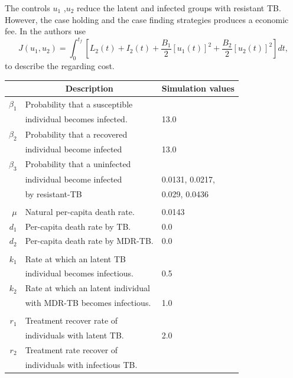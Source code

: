 	The controls $u_1$ ,$u_2$ reduce the latent and infected 
groups with resistant TB. However, the case holding and the case finding 
strategies produces a economic fee. In \cite{Lenhart2002} the authors use
\begin{equation}
	 J(u_1, u_2) =
		 \int_0 ^ {t_f}
			 \left[
				 L_2(t) + I_2(t) 
				 + \frac{B_1}{2} [u_1(t)] ^ 2
				 + \frac{B_2}{2} [u_2(t)] ^ 2
			 \right]dt,
\end{equation}
to describe the regarding cost.
\begin{table}
	\centering
	\begin{tabular}{rll}
		\toprule
			& \multicolumn{1}{c}{\textbf{Description}} & \textbf{Simulation values}
            \\
        \midrule
        $\beta_1$ 
            & Probability that a susceptible 
            \\
            & individual becomes infected.
            & \num{13.0}            
            \\
        $\beta_2$ 
        	& Probability that a recovered 
        	\\
        	& individual  become infected
        	& \num{13.0}
        	\\
        $\beta_3$ 
        	& Probability that a uninfected 
        	\\
        	& individual become infected 
            & \num{0.0131}, 
              \num{0.0217},
            \\
            & by resistant-TB 
            & \num{0.029}, 
              \num{0.0436}
       		\\
     	\\
     	$\mu$ 
     	    & Natural per-capita death rate.
     	    & \num{0.0143}
			\\
     	$d_1$ 
     	    & Per-capita death rate by TB.
     	    & \num{0.0}
     	    \\
     	$d_2$ 
     	   	& Per-capita  death rate by MDR-TB.
     	   	& \num{0.0}
     	    \\
     	\\
     	$k_1$ 
     		& Rate at which an latent TB 
     		\\
     		& individual becomes infectious. 
     		& \num{0.5}
 			\\
     	    $k_2$  
     	    & Rate at which an latent individual
     	    \\
     	    & with MDR-TB becomes infectious.
     	    & \num{1.0}
		\\
		\\
		$r_1$ & 
      		Treatment recover rate of 
      		\\
      		& individuals with latent TB.
      		& \num{2.0}
     	    \\
		$r_2$ 
			& Treatment rate recover of 
			\\
			& individuals with infectious TB.
		

\end{tabular}
\end{table}
